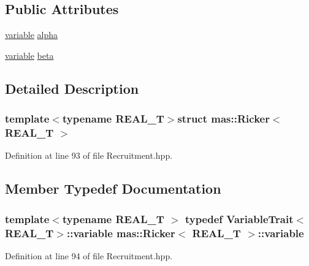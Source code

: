 \subsection*{Public Attributes}
\begin{DoxyCompactItemize}
\item 
\hyperlink{structmas_1_1_ricker_a1e7489f196696277bb4c4fab0b5db240}{variable} \hyperlink{structmas_1_1_ricker_a50aa86b70525d2103514d9bf4152b130}{alpha}
\item 
\hyperlink{structmas_1_1_ricker_a1e7489f196696277bb4c4fab0b5db240}{variable} \hyperlink{structmas_1_1_ricker_ac3ac0028bef4f094b30861c4bef9f5b8}{beta}
\end{DoxyCompactItemize}


\subsection{Detailed Description}
\subsubsection*{template$<$typename R\-E\-A\-L\-\_\-\-T$>$struct mas\-::\-Ricker$<$ R\-E\-A\-L\-\_\-\-T $>$}



Definition at line 93 of file Recruitment.\-hpp.



\subsection{Member Typedef Documentation}
\hypertarget{structmas_1_1_ricker_a1e7489f196696277bb4c4fab0b5db240}{
\subsubsection[{variable}]{\setlength{\rightskip}{0pt plus 5cm}template$<$typename R\-E\-A\-L\-\_\-\-T $>$ typedef {\bf Variable\-Trait}$<$R\-E\-A\-L\-\_\-\-T$>$\-::{\bf variable} {\bf mas\-::\-Ricker}$<$ R\-E\-A\-L\-\_\-\-T $>$\-::{\bf variable}}}\label{structmas_1_1_ricker_a1e7489f196696277bb4c4fab0b5db240}


Definition at line 94 of file Recruitment.\-hpp.



